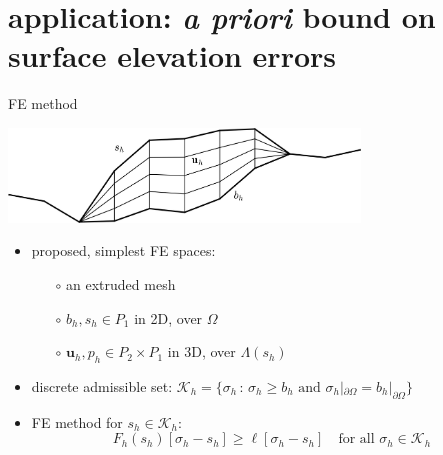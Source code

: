 \documentclass[10pt,svgnames]{beamer}
\newcommand{\bu}{\mathbf{u}}
\newcommand{\cK}{\mathcal{K}}
\begin{document}
\section{application:  \emph{a priori} bound on surface elevation errors}

\begin{frame}{FE method}

\begin{center}
\includegraphics[width=0.7\textwidth]{extruded}
\end{center}

\begin{itemize}
\item proposed, simplest FE spaces:
   \begin{itemize}
   \item[$\circ$] an extruded mesh
   \item[$\circ$] $b_h,s_h \in P_1$ in 2D, over $\Omega$
   \item[$\circ$] $\bu_h,p_h \in P_2 \times P_1$ in 3D, over $\Lambda(s_h)$
   \end{itemize}
\item discrete admissible set: $\cK_h = \{\sigma_h \,:\, \sigma_h \ge b_h \text{ and } {\sigma_h}|_{\partial\Omega} = {b_h}|_{\partial\Omega}\}$
\item FE method for $s_h\in\cK_h$:
   $$F_h(s_h)[\sigma_h-s_h] \ge \ell[\sigma_h-s_h] \quad \text{for all } \sigma_h \in \cK_h$$
\end{itemize}

\phantom{x}
\end{frame}
\end{document}
